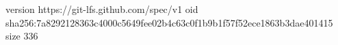 version https://git-lfs.github.com/spec/v1
oid sha256:7a8292128363c4000c5649fee02b4c63c0f1b9b1f57f52ece1863b3dae401415
size 336
